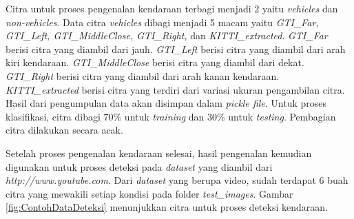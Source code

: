 Citra untuk proses pengenalan kendaraan terbagi menjadi 2 yaitu \textit{vehicles} dan \textit{non-vehicles}. Data citra \textit{vehicles} dibagi menjadi 5 macam yaitu \textit{GTI\_Far, GTI\_Left, GTI\_MiddleClose, GTI\_Right,} dan \textit{KITTI\_extracted}.
\textit{GTI\_Far} berisi citra yang diambil dari jauh. \textit{GTI\_Left} berisi citra yang diambil dari arah kiri kendaraan. \textit{GTI\_MiddleClose} berisi citra yang diambil dari dekat. \textit{GTI\_Right} berisi citra yang diambil dari arah kanan kendaraan. \textit{KITTI\_extracted} berisi citra yang terdiri dari variasi ukuran pengambilan citra. Hasil dari pengumpulan data akan disimpan dalam \textit{pickle file}. Untuk proses klasifikasi, citra dibagi 70\% untuk \textit{training} dan 30\% untuk \textit{testing}. Pembagian citra dilakukan secara acak.

Setelah proses pengenalan kendaraan selesai, hasil pengenalan kemudian digunakan untuk proses deteksi pada \textit{dataset} yang diambil dari \textit{http://www.youtube.com}. Dari \textit{dataset} yang berupa video, sudah terdapat 6 buah citra yang mewakili setiap kondisi pada folder \textit{test\_images}. Gambar \ref{fig:ContohDataDeteksi} menunjukkan citra untuk proses deteksi kendaraan.

